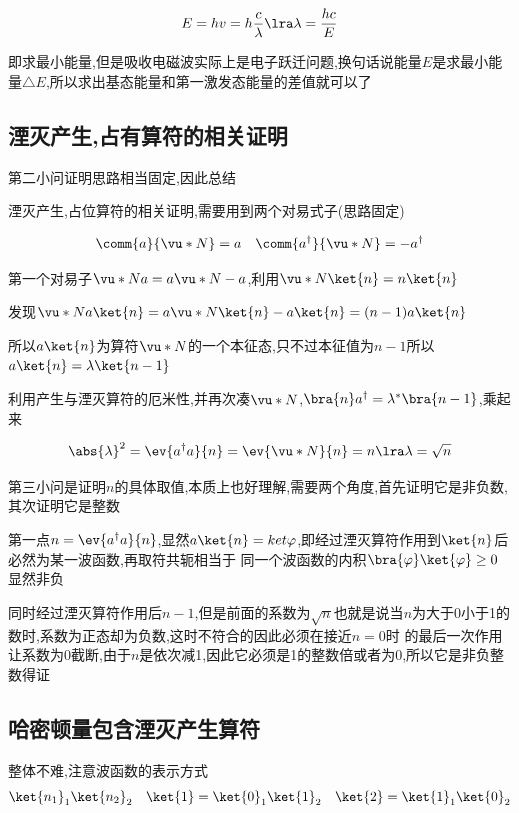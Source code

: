             $$
            E = hv = h \frac{c}{\lambda} \lra \lambda = \frac{hc}{E}
            $$

            即求最小能量,但是吸收电磁波实际上是电子跃迁问题,换句话说能量$E$是求最小能量$\triangle E$,所以求出基态能量和第一激发态能量的差值就可以了

        \subsection{湮灭产生,占有算符的相关证明}
            第二小问证明思路相当固定,因此总结

            \begin{formal}
                湮灭产生,占位算符的相关证明,需要用到两个对易式子(思路固定)

                $$
                \comm{a}{\vu*{N}} = a \quad \comm{a^{\dagger}}{\vu*{N}} = -a^{\dagger}
                $$

                第一个对易子$ \vu*{N}a  = a\vu*{N} - a $,利用$\vu*{N}\ket{n} = n\ket{n}$

                发现$ \vu*{N}a\ket{n} = a\vu*{N}\ket{n} - a\ket{n} = (n-1) a \ket{n} $

                所以$a\ket{n}$为算符$\vu*{N}$的一个本征态,只不过本征值为$n-1$所以$a\ket{n} = \lambda \ket{n-1}$

                利用产生与湮灭算符的厄米性,并再次凑$\vu*{N}$,$\bra{n} a^{\dagger} = \lambda^{*} \bra{n-1}$,乘起来

                $$
                \abs{\lambda}^{2} = \ev{a^{\dagger}a}{n} = \ev{\vu*{N}}{n} = n \lra \lambda = \sqrt{n}
                $$
            \end{formal}

            第三小问是证明$n$的具体取值,本质上也好理解,需要两个角度,首先证明它是非负数,其次证明它是整数

            第一点$ n = \ev{a^{\dagger}a}{n} $,显然$a\ket{n} = ket{\varphi}$,即经过湮灭算符作用到$\ket{n}$后必然为某一波函数,再取符共轭相当于
            同一个波函数的内积$ \bra{\varphi}\ket{\varphi} \ge 0$显然非负

            同时经过湮灭算符作用后$n-1$,但是前面的系数为$\sqrt{n}$也就是说当$n$为大于0小于1的数时,系数为正态却为负数,这时不符合的因此必须在接近$n=0$时
            的最后一次作用让系数为0截断,由于$n$是依次减1,因此它必须是1的整数倍或者为0,所以它是非负整数得证


        \subsection{哈密顿量包含湮灭产生算符}
            整体不难,注意波函数的表示方式
            $$
            \ket{n_{1}}_{1} \ket{n_{2}}_{2} \quad \ket{1} = \ket{0}_{1}\ket{1}_{2} \quad \ket{2} = \ket{1}_{1}\ket{0}_{2}
            $$
        

